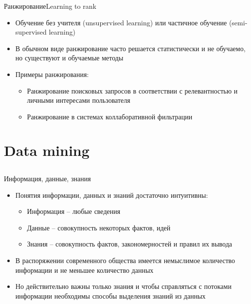 \documentclass[compress,red,unicode]{beamer}
\begin{document}
\begin{frame}{Ранжирование}{Learning to rank}
\begin{itemize}
	\item Обучение без учителя (unsupervised learning) или частичное обучение (semi-supervised learning)
	\item В обычном виде ранжирование часто решается статистически и не обучаемо, но существуют и обучаемые методы
	\item Примеры ранжирования:
	\begin{itemize}
		\item {\color{main!90!black} Ранжирование поисковых запросов в соответствии с релевантностью и личными интересами пользователя}
		\item {\color{main!90!black} Ранжирование в системах коллаборативной фильтрации}
	\end{itemize}
\end{itemize}
\end{frame}





\subsection{}







\section{Data mining}
\subsection{}

\begin{frame}{Информация, данные, знания}
\begin{itemize}
\item Понятия информации, данных и знаний достаточно интуитивны:
	\begin{itemize}
	\item Информация -- любые сведения
	\item Данные -- совокупность некоторых фактов, идей
	\item Знания -- совокупность фактов, закономерностей и правил их вывода 
	\end{itemize}
\item В распоряжении современного общества имеется немыслимое количество информации и не меньшее количество данных
\item Но действительно важны только знания и чтобы справляться с потоками информации необходимы способы выделения знаний из данных
\end{itemize}
\end{frame}
\end{document}
